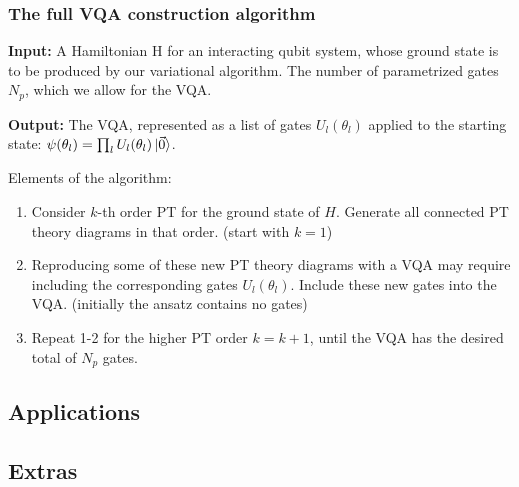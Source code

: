\documentclass[10pt, a4paper]{article}
\begin{document}
\subsubsection*{The full VQA construction algorithm}

\textbf{Input:} A Hamiltonian H for an interacting qubit system, whose ground state is to be produced by our variational algorithm. The number of parametrized gates $N_p$, which we allow for the VQA.

\textbf{Output:} The VQA, represented as a list of gates $U_l(\theta_l)$ applied to the starting state: $\psi(\theta_l)=\prod_lU_l(\theta_l) \ket{\vec{0}}$.

Elements of the algorithm:

\begin{enumerate}
\item Consider $k$-th order PT for the ground state of $H$. Generate all connected PT theory diagrams in that order. (start with $k=1$)

\item Reproducing some of these new PT theory diagrams with a VQA may require including the corresponding gates $U_l(\theta_l)$. Include these new gates into the VQA. (initially the ansatz contains no gates)

\item Repeat 1-2 for the higher PT order $k=k+1$, until the VQA has the desired total of $N_p$ gates.
\end{enumerate} 

\subsection*{Applications}
\subsection*{Extras}
\end{document}

